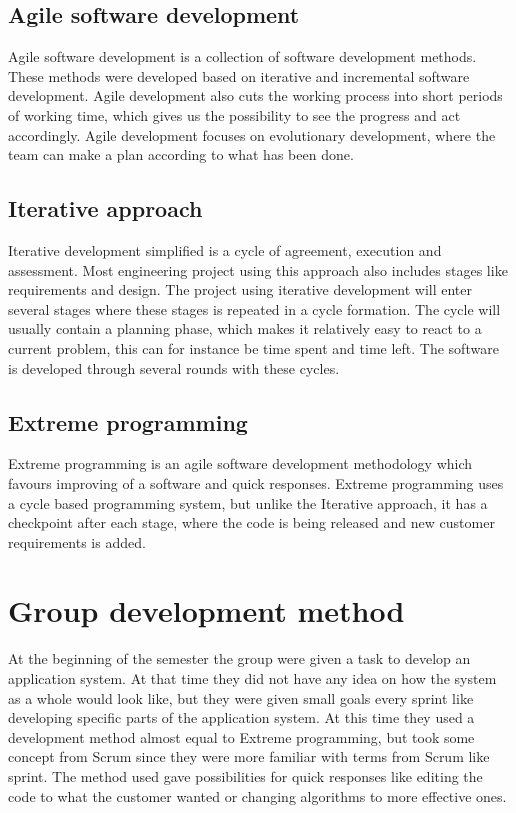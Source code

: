 \subsection{Agile software development}
Agile software development is a collection of software development methods. These methods were developed based on iterative and incremental software development. Agile development also cuts the working process into short periods of working time, which gives us the possibility to see the progress and act accordingly. Agile development focuses on evolutionary development, where the team can make a plan according to what has been done.  
%
\subsection{Iterative approach}
Iterative development simplified is a cycle of agreement, execution and assessment. Most engineering project using this approach also includes stages like requirements and design. The project using iterative development will enter several stages where these stages is repeated in a cycle formation. The cycle will usually contain a planning phase, which makes it relatively easy to react to a current problem, this can for instance be time spent and time left. The software is developed through several rounds with these cycles. 
%
\subsection{Extreme programming}
Extreme  programming is an agile software development methodology which favours improving of a software and quick responses. Extreme programming uses a cycle based programming system, but unlike the Iterative approach, it has a checkpoint after each stage, where the code is being released and new customer requirements is added.
%
\section{Group development method} 
At the beginning of the semester the group were given a task to develop an application system. At that time they did not have any idea on how the system as a whole would look like, but they were given small goals every sprint like developing specific parts of the application system. At this time they used a development method almost equal to Extreme programming, but took some concept from Scrum since they were more familiar with terms from Scrum like sprint. The method used gave possibilities for quick responses like editing the code to what the customer wanted or changing algorithms to more effective ones.

